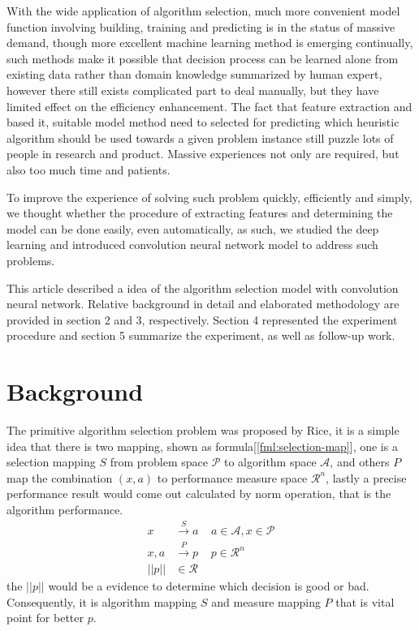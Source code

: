 \documentclass{article}
\begin{document}
    With the wide application of algorithm selection, much more convenient model function involving building, training and predicting is in the status of massive demand, though more excellent machine learning method is emerging continually, such methods make it possible that decision process can be learned alone from existing data rather than domain knowledge summarized by human expert, however there still exists complicated part to deal manually, but they have limited effect on the efficiency enhancement. The fact that feature extraction and based it, suitable model method need to selected for predicting which heuristic algorithm should be used towards a given problem instance still puzzle lots of people in research and product. Massive experiences not only are required, but also too much time and patients.
    
    To improve the experience of solving such problem quickly, efficiently and simply, we thought whether the procedure of extracting features and determining the model can be done easily, even automatically, as such, we studied the deep learning\cite{lecun2015deep} and introduced convolution neural network\cite{krizhevsky2012imagenet} model to address such problems.
    
    This article described a idea of the algorithm selection model with convolution neural network. Relative background in detail and elaborated methodology are provided in section 2 and 3, respectively. Section 4 represented the experiment procedure and section 5 summarize the experiment, as well as follow-up work.

\section{Background}
    The primitive algorithm selection problem was proposed by Rice\cite{rice1976algorithm}, it is a simple idea that there is two mapping, shown as formula[\ref{fml:selection-map}], one is a selection mapping $S$ from problem space $\mathcal{P}$ to algorithm space $\mathcal{A}$, and others $P$ map the combination $(x,a)$ to performance measure space $\mathcal{R}^n$, lastly a precise performance result would come out calculated by norm operation, that is the algorithm performance.
    \begin{equation}\label{fml:selection-map}
    \begin{split}
    x &\stackrel{S}{\longrightarrow}a\;\;\;\;a\in\mathcal{A},x\in\mathcal{P} \\
    x,a &\stackrel{P}{\longrightarrow}p\;\;\;\;p\in\mathcal{R}^n \\
    ||p|| &\in\mathcal{R}
    \end{split}
    \end{equation}
    the $||p||$ would be a evidence to determine which decision is good or bad. Consequently, it is algorithm mapping $S$ and measure mapping $P$ that is vital point for better $p$.
    
\end{document}

